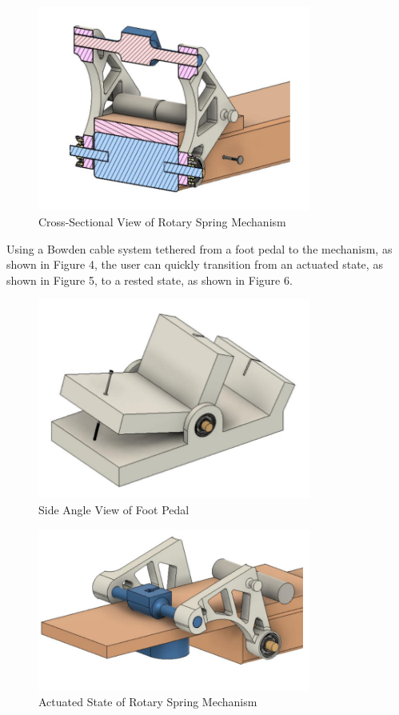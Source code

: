 \documentclass[12pt]{article}
\theoremstyle{definition} %
\theoremstyle{plain} %
\begin{document}
\begin{figure}[htbp]
  \centering
  \includegraphics[width=0.8\textwidth]{classes/Mathematics-of-Guitar-Strings/06-10/fgs/fig3.png}
  \caption{Cross-Sectional View of Rotary Spring Mechanism}
  \label{fig:}
\end{figure}

Using a Bowden cable system tethered from a foot pedal to the mechanism, as shown in
Figure 4, the user can quickly transition from an actuated state, as shown in Figure 5, to a rested
state, as shown in Figure 6.

\begin{figure}[htbp]
  \centering
  \includegraphics[width=0.8\textwidth]{classes/Mathematics-of-Guitar-Strings/06-10/fgs/fig4.png}
  \caption{Side Angle View of Foot Pedal}
  \label{fig:}
\end{figure}

\begin{figure}[htbp]
  \centering
  \includegraphics[width=0.8\textwidth]{classes/Mathematics-of-Guitar-Strings/06-10/fgs/fig5.png}
  \caption{Actuated State of Rotary Spring Mechanism}
  \label{fig:}
\end{figure}
\end{document}
